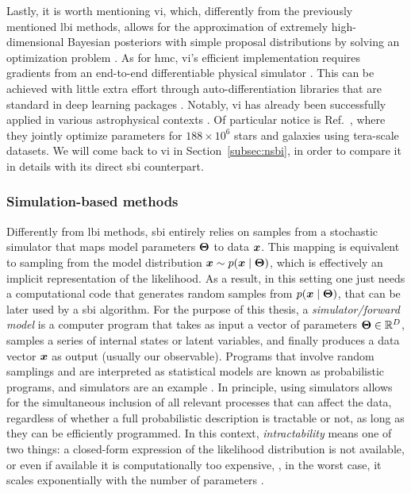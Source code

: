 Lastly, it is worth mentioning \gls*{vi}, which, differently from the previously mentioned \gls*{lbi} methods, allows for the approximation of extremely high-dimensional Bayesian posteriors with simple proposal distributions by solving an optimization problem \cite{hoffman2013stochastic, zhang2018advances}. As for \gls*{hmc}, \gls*{vi}'s efficient implementation requires gradients from an end-to-end differentiable physical simulator \cite[\eg][]{caustic, Morvan_2021, sstrax}. This can be achieved with little extra effort through auto-differentiation libraries that are standard in deep learning packages \cite[\eg][]{pytorch, jax2018github}. Notably, \gls*{vi} has already been successfully applied in various astrophysical contexts \cite{regier2019cataloging, liu2023variational, Mishra-Sharma:2020kjb, Karchev:2021fro, leike2020resolving}. Of particular notice is Ref.~\cite{regier2019cataloging}, where they jointly optimize parameters for $188\times 10^6$ stars and galaxies using tera-scale datasets. We will come back to \gls*{vi} in Section~\ref{subsec:nsbi}, in order to compare it in details with its direct \gls*{sbi} counterpart. 

\subsubsection{Simulation-based methods}

Differently from \gls*{lbi} methods, \gls*{sbi} entirely relies on samples from a stochastic simulator that maps model parameters $\bm{\Theta}$ to data $\bm{x}$. This mapping is equivalent to sampling from the model distribution $\bm{x} \sim p(\bm{x}\mid\bm{\Theta})$, which is effectively an implicit representation of the likelihood. As a result, in this setting one just needs a computational code that generates random samples from $p(\bm{x}\mid\bm{\Theta})$, that can be later used by a \gls*{sbi} algorithm. For the purpose of this thesis, a \emph{simulator/forward model} is a computer program that takes as input a vector of parameters $\bm{\Theta} \in \mathbb{R}^D$, samples a series of internal states or latent variables, and finally produces a data vector  $\bm{x}$  as output (usually our observable). Programs that involve random samplings and are interpreted as statistical models are known as probabilistic programs, and simulators are an example \cite{Cranmer:2019eaq}. In principle, using simulators allows for the simultaneous inclusion of all relevant processes that can affect the data, regardless of whether a full probabilistic description is tractable or not, as long as they can be efficiently programmed. In this context, \emph{intractability} means one of two things: a closed-form expression of the likelihood distribution is not available, or even if available it is computationally too expensive, \eg, in the worst case, it scales exponentially with the number of parameters \cite{Leclercq:2018who, Mootoovaloo:2020ott}.

